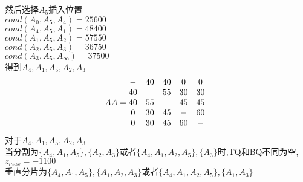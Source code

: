 \documentclass{article}
\begin{document}
\begin{CJK}{UTF8}{gbsn}
	然后选择$A_5$插入位置\\
	$cond(A_0,A_5,A_4)=25600$\\
	$cond(A_4,A_5,A_1)=48400$\\
	$cond(A_1,A_5,A_2)=57550$\\
	$cond(A_2,A_5,A_3)=36750$\\
	$cond(A_3,A_5,A_\infty)=37500$\\
	得到$A_4,A_1,A_5,A_2,A_3$\\	
	\begin{equation*}
	AA=\begin{matrix}
	-&40&40&0&0\\
	40&-&55&30&30\\
	40&55&-&45&45\\
	0&30&45&-&60\\
	0&30&45&60&-\\
	\end{matrix}\\
	\end{equation*}
	对于$A_4,A_1,A_5,A_2,A_3$\\
	当分割为$\{A_4,A_1,A_5\},\{A_2,A_3\}$或者$\{A_4,A_1,A_2,A_5\},\{A_3\}$时,TQ和BQ不同为空,$z_{max}=-1100$\\
	垂直分片为$\{A_4,A_1,A_5\},\{A_1,A_2,A_3\}$或者$\{A_4,A_1,A_2,A_5\},\{A_1,A_3\}$\\

\end{CJK}
\end{document}
